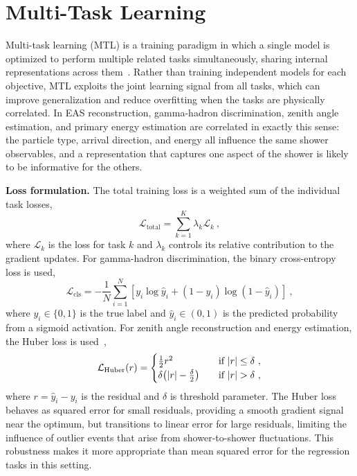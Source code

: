 \section{Multi-Task Learning}
\label{sec:multitask}

Multi-task learning (MTL) is a training paradigm in which a single model is optimized to perform multiple related tasks simultaneously, sharing internal representations across them~. Rather than training independent models for each objective, MTL exploits the joint learning signal from all tasks, which can improve generalization and reduce overfitting when the tasks are physically correlated. In EAS reconstruction, gamma-hadron discrimination, zenith angle estimation, and primary energy estimation are correlated in exactly this sense: the particle type, arrival direction, and energy all influence the same shower observables, and a representation that captures one aspect of the shower is likely to be informative for the others.

\textbf{Loss formulation.} The total training loss is a weighted sum of the individual task losses,
\begin{equation}
    \mathcal{L}_\text{total} = \sum_{k=1}^K \lambda_k \mathcal{L}_k \ ,
\end{equation}
where $\mathcal{L}_k$ is the loss for task $k$ and $\lambda_k$ controls its relative contribution to the gradient updates. For gamma-hadron discrimination, the binary cross-entropy loss is used,
\begin{equation}
    \mathcal{L}_\text{cls} = -\frac{1}{N}\sum_{i=1}^N [y_i \log{\hat{y}_i} + (1-y_i)\log{(1 - \hat{y}_i)}] \ ,
\end{equation}
where $y_i \in \{0,1\}$ is the true label and $\hat{y}_i \in (0,1)$ is the predicted probability from a sigmoid activation. For zenith angle reconstruction and energy estimation, the Huber loss is used~,
\begin{equation}
    \mathcal{L}_\text{Huber}(r) = \begin{cases}
        \frac{1}{2}r^2 & \quad \text{if} \ |r| \leq \delta \ , \\
        \delta \qty(|r| - \frac{\delta}{2}) & \quad \text{if} \ |r| > \delta \ ,
    \end{cases}
\end{equation}
where $r = \hat{y}_i - y_i$ is the residual and $\delta$ is threshold parameter. The Huber loss behaves as squared error for small residuals, providing a smooth gradient signal near the optimum, but transitions to linear error for large residuals, limiting the influence of outlier events that arise from shower-to-shower fluctuations. This robustness makes it more appropriate than mean squared error for the regression tasks in this setting.

